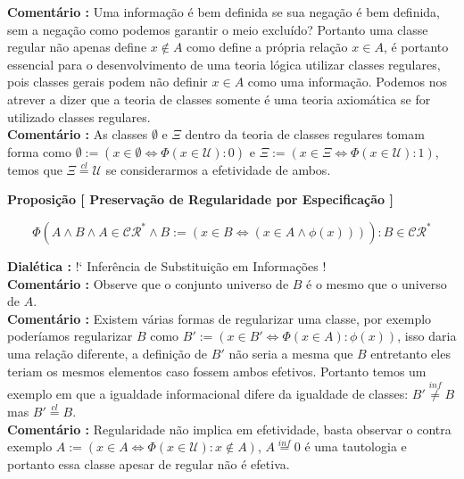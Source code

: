 \documentclass[10pt,a4paper]{report}
\begin{document}
\textbf{Comentário :} Uma informação é bem definida se sua negação é bem definida, sem a negação como podemos garantir o meio excluído? Portanto uma classe regular não apenas define $ x \notin A$ como define a própria relação $x \in A$, é portanto essencial para o desenvolvimento de uma teoria lógica utilizar classes regulares, pois classes gerais podem não definir $x \in A$ como uma informação. Podemos nos atrever a dizer que a teoria de classes somente é uma teoria axiomática se for utilizado classes regulares.\\

\textbf{Comentário :} As classes $\emptyset$ e $ \Xi $ dentro da teoria de classes regulares tomam forma como $\emptyset := ( x \in \emptyset \iff \Phi(x\in \mathcal{U}) : 0 )$ e $ \Xi := ( x \in \Xi \iff \Phi( x \in \mathcal{U} ) : 1 )$, temos que $ \Xi \overset{cl}{=} \mathcal{U} $ se considerarmos a efetividade de ambos.

\hspace{\baselineskip}

\textbf{Proposição [ Preservação de Regularidade por Especificação ]}

$$ \Phi( A \wedge B \wedge A \in \mathcal{CR}^* \wedge B:=( x \in B \iff ( x \in A \wedge \phi(x) ) ) ) : B \in \mathcal{CR}^*  $$

\textbf{Dialética :} !` Inferência de Substituição em Informações !\\

\textbf{Comentário :} Observe que o conjunto universo de $B$ é o mesmo que o universo de $A$.\\

\textbf{Comentário :} Existem várias formas de regularizar uma classe, por exemplo poderíamos regularizar $B$ como $ B':= ( x \in B' \iff \Phi( x \in A ) : \phi(x) ) $, isso daria uma relação diferente, a definição de $B'$ não seria a mesma que $B$ entretanto eles teriam os mesmos elementos caso fossem ambos efetivos. Portanto temos um exemplo em que a igualdade informacional difere da igualdade de classes: $B' \overset{inf}{\neq} B$ mas $ B' \overset{cl}{=} B $.\\

\textbf{Comentário :} Regularidade não implica em efetividade, basta observar o contra exemplo $ A:=(x \in A \iff \Phi(x \in \mathcal{U}): x \notin A ) $, $A\overset{inf}{=}0$ é uma tautologia e portanto essa classe apesar de regular não é efetiva.
\end{document}

